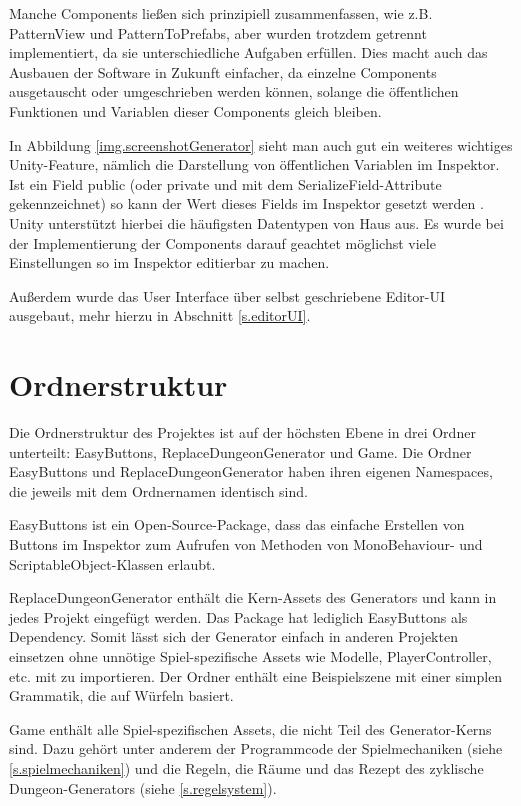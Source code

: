 Manche Components ließen sich prinzipiell zusammenfassen, wie z.B. PatternView und PatternToPrefabs, aber wurden trotzdem getrennt implementiert, da sie unterschiedliche Aufgaben erfüllen. Dies macht auch das Ausbauen der Software in Zukunft einfacher, da einzelne Components ausgetauscht oder umgeschrieben werden können, solange die öffentlichen Funktionen und Variablen dieser Components gleich bleiben.

In Abbildung \ref{img.screenshotGenerator} sieht man auch gut ein weiteres wichtiges Unity-Feature, nämlich die Darstellung von öffentlichen Variablen im Inspektor. Ist ein Field public (oder private und mit dem SerializeField-Attribute gekennzeichnet) so kann der Wert dieses Fields im Inspektor gesetzt werden \cite[Seite: VariablesAndTheInspector]{unityManual} \cite[Seite: SerializeField]{unitySciptingReference}. Unity unterstützt hierbei die häufigsten Datentypen von Haus aus. Es wurde bei der Implementierung der Components darauf geachtet möglichst viele Einstellungen so im Inspektor editierbar zu machen.

Außerdem wurde das User Interface über selbst geschriebene Editor-UI ausgebaut, mehr hierzu in Abschnitt \ref{s.editorUI}.

\section{Ordnerstruktur}

Die Ordnerstruktur des Projektes ist auf der höchsten Ebene in drei Ordner unterteilt: EasyButtons, ReplaceDungeonGenerator und Game. Die Ordner EasyButtons und ReplaceDungeonGenerator haben ihren eigenen Namespaces, die jeweils mit dem Ordnernamen identisch sind.

EasyButtons ist ein Open-Source-Package, dass das einfache Erstellen von Buttons im Inspektor zum Aufrufen von Methoden von MonoBehaviour- und ScriptableObject-Klassen erlaubt. \cite{easyButtons}

ReplaceDungeonGenerator enthält die Kern-Assets des Generators und kann in jedes Projekt eingefügt werden. Das Package hat lediglich EasyButtons als Dependency. Somit lässt sich der Generator einfach in anderen Projekten einsetzen ohne unnötige Spiel-spezifische Assets wie Modelle, PlayerController, etc. mit zu importieren. Der Ordner enthält eine Beispielszene mit einer simplen Grammatik, die auf Würfeln basiert.

Game enthält alle Spiel-spezifischen Assets, die nicht Teil des Generator-Kerns sind. Dazu gehört unter anderem der Programmcode der Spielmechaniken (siehe \ref{s.spielmechaniken}) und die Regeln, die Räume und das Rezept des zyklische Dungeon-Generators (siehe \ref{s.regelsystem}).

